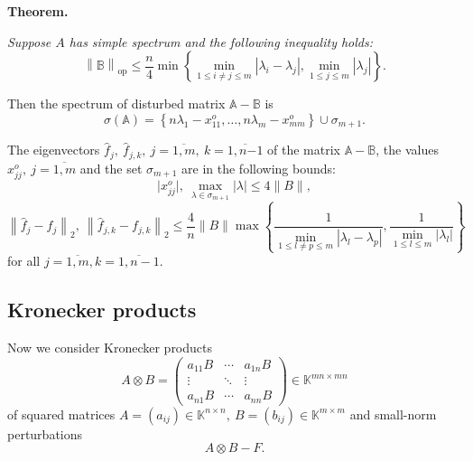 \documentclass[a4paper]{jpconf}
\begin{document}
\begin{center}
\textbf{Theorem.}
{\it
Suppose \( A \) has simple spectrum and the following inequality holds:
\[
    \left\| \mathbb{B} \right\|_{\mathrm{op}}
        \leq 
        \frac{n}{4}
         \min\left\{
             \min\limits_{1\leq i{\neq}j \leq m }{|\lambda_i - \lambda_j|},
             \min\limits_{1\leq j \leq m}{|\lambda_j|}
         \right\}.
 \]

Then the spectrum of disturbed matrix \( \mathbb{A} - \mathbb{B} \) is
\[
    \sigma\left(\mathbb{A}\right) =
        \left\{
            n\lambda_1 - x_{11}^o, \ldots, n\lambda_m - x_{mm}^o
        \right\}
    \cup \sigma_{m{+}1}.
\]

The eigenvectors
    \( \hat{f}_j,\ \hat{f}_{j,k},\ j{=}\overline{1,m},\ k{=}\overline{1,n{-1}} \)
    of the matrix \( \mathbb{A}{-}\mathbb{B} \),
    the values \( x_{jj}^o,\ j{=}\overline{1,m} \)
    and the set \( \sigma_{m{+}1} \) are in the following bounds:
\[
    \lvert x_{jj}^o\rvert,
    \ \max_{\lambda\in\sigma_{m{+}1}} \lvert\lambda\rvert
    \leq 4\|B\|,
\]
\[
    \left\| \hat{f}_j - f_j \right\|_2,
    \ \left\| \hat{f}_{j,k} - f_{j,k}\right\|_2
    \leq
    \frac4n \|B\|
         \max\left\{
         \frac{1}{
             \min\limits_{1\leq l{\neq}p \leq m }{|\lambda_l - \lambda_p|}},
         \frac{1}{
             \min\limits_{1\leq l \leq m}{|\lambda_l|}}
         \right\}
\]
for all \( j{=}\overline{1,m}, k{=}\overline{1,n-1} \).
\/}
\end{center}

\subsection*{Kronecker products}

Now we consider Kronecker products
\[
    A\otimes B =
    \begin{pmatrix}
        a_{11} B & \cdots & a_{1n} B \\
        \vdots   & \ddots & \vdots \\
        a_{n1} B & \cdots & a_{nn} B
    \end{pmatrix}
    \in \mathbb{K}^{{mn}{\times}{mn}}
\]
of squared matrices
\( A={(a_{ij})}\in\mathbb{K}^{n{\times}n},
 \ B={(b_{ij})}\in\mathbb{K}^{m{\times}m} \)
and small-norm perturbations
\[
    A\otimes B - F.
\]

\end{document}

